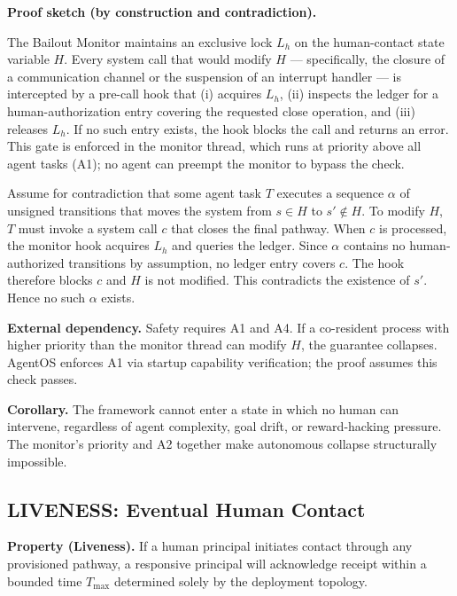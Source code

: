 \medskip\noindent\textbf{Proof sketch (by construction and contradiction).}

The Bailout Monitor maintains an exclusive lock $L_h$ on the human-contact state variable $H$. Every system call that would modify $H$ — specifically, the closure of a communication channel or the suspension of an interrupt handler — is intercepted by a pre-call hook that (i) acquires $L_h$, (ii) inspects the ledger for a human-authorization entry covering the requested close operation, and (iii) releases $L_h$. If no such entry exists, the hook blocks the call and returns an error. This gate is enforced in the monitor thread, which runs at priority above all agent tasks (A1); no agent can preempt the monitor to bypass the check.

Assume for contradiction that some agent task $T$ executes a sequence $\alpha$ of unsigned transitions that moves the system from $s \in H$ to $s' \notin H$. To modify $H$, $T$ must invoke a system call $c$ that closes the final pathway. When $c$ is processed, the monitor hook acquires $L_h$ and queries the ledger. Since $\alpha$ contains no human-authorized transitions by assumption, no ledger entry covers $c$. The hook therefore blocks $c$ and $H$ is not modified. This contradicts the existence of $s'$. Hence no such $\alpha$ exists.

\medskip\noindent\textbf{External dependency.} Safety requires A1 and A4. If a co-resident process with higher priority than the monitor thread can modify $H$, the guarantee collapses. AgentOS enforces A1 via startup capability verification; the proof assumes this check passes.

\medskip\noindent\textbf{Corollary.} The framework cannot enter a state in which no human can intervene, regardless of agent complexity, goal drift, or reward-hacking pressure. The monitor's priority and A2 together make autonomous collapse structurally impossible.

\subsection{LIVENESS: Eventual Human Contact}\label{sec:liveness}

\textbf{Property (Liveness).} If a human principal initiates contact through any provisioned pathway, a responsive principal will acknowledge receipt within a bounded time $T_{\max}$ determined solely by the deployment topology.

